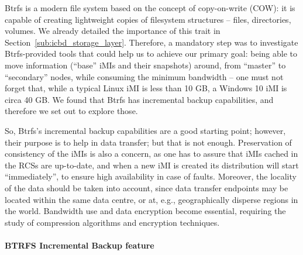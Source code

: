 Btrfs is a modern file system based on the concept of copy-on-write (COW): it is capable of creating lightweight copies of filesystem structures – files, directories, volumes. We already detailed the importance of this trait in Section~\ref{sub:icbd_storage_layer}. Therefore, a mandatory step was to investigate Btrfs-provided tools that could help us to achieve our primary goal: being able to move information (“base” iMIs and their snapshots) around, from “master” to “secondary” nodes, while consuming the minimum bandwidth – one must not forget that, while a typical Linux iMI is less than 10 GB, a Windows 10 iMI is circa 40 GB. We found that Btrfs has incremental backup capabilities, and therefore we set out to explore those.
 
So,  Btrfs’s incremental backup capabilities are a good starting point; however, their purpose is to help in data transfer; but that is not enough. Preservation of consistency of the iMIs is also a concern, as one has to assure that iMIs cached in the RCSs are up-to-date, and when a new iMI is created its distribution will start “immediately”, to ensure high availability in case of faults. Moreover, the locality of the data should be taken into account, since data transfer endpoints may be located within the same data centre, or at, e.g., geographically disperse regions in the world. Bandwidth use and data encryption become essential, requiring the study of compression algorithms and encryption techniques.


\paragraph{BTRFS Incremental Backup feature}
\label{par:impl_incremental_btrfs}



